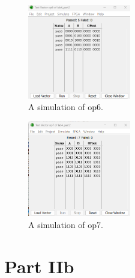 \documentclass{article}
\begin{document}
\begin{enumerate}
\begin{figure}[ht!]
    \centering
    \includegraphics[width=0.4\textwidth]{lab4_op6_simulation.png}
    \caption{A simulation of op6.}
    \label{f:op6_simulation}
\end{figure}

\begin{figure}[ht!]
    \centering
    \includegraphics[width=0.4\textwidth]{lab4_op7_simulation.png}
    \caption{A simulation of op7.}
    \label{f:op7_simulation}
\end{figure}


\end{enumerate}

\section*{Part IIb}
\end{document}
